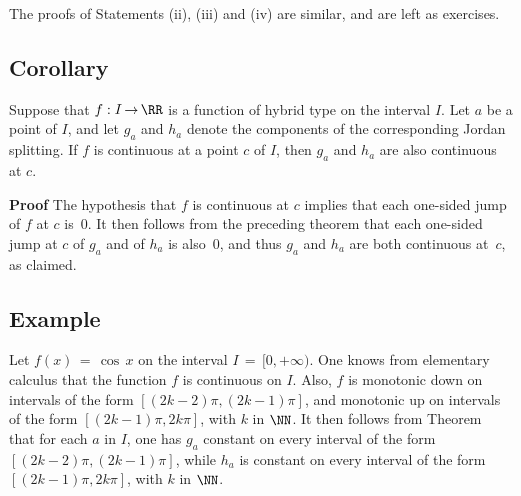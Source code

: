         The proofs of Statements (ii), (iii) and (iv) are similar, and are left as exercises.

\V
\V

             \subsection{\small{\bf Corollary}}
            \label{CorF40.160}

        Suppose that $f:I \,{\rightarrow}\, {\RR}$ is a function of hybrid type on the interval $I$.
    Let $a$ be a point of $I$, and let $g_{a}$ and $h_{a}$ denote the components of the corresponding Jordan splitting.
    If $f$ is continuous at a point $c$ of $I$, then $g_{a}$ and $h_{a}$ are also continuous at $c$.

\V

        {\bf Proof} The hypothesis that $f$ is continuous at $c$ implies that each one-sided jump of $f$ at $c$ is~$0$.
    It then follows from the preceding theorem that each one-sided jump at $c$ of $g_{a}$ and of $h_{a}$ is also~$0$, and thus $g_{a}$ and $h_{a}$ are both continuous at~$c$, as claimed.

\V
\V

             \subsection{\small{\bf Example}}
            \label{ExampF40.170}

\V

\hspace*{\parindent}Let $f(x) \,=\, {\cos}\,x$ on the interval $I \,=\,[0,+{\infty})$.
    One knows from elementary calculus that the function $f$ is continuous on $I$.
    Also, $f$ is monotonic down on intervals of the form $[(2k-2){\pi},(2k-1){\pi}]$,
    and monotonic up on intervals of the form $[(2k-1){\pi},2k{\pi}]$, with $k$ in ${\NN}$.
    It then follows from Theorem~ that for each $a$ in $I$, one has $g_{a}$ constant on every interval of the form $[(2k-2){\pi},(2k-1){\pi}]$,
    while $h_{a}$ is constant on every interval of the form $[(2k-1){\pi},2k{\pi}]$, with $k$ in ${\NN}$.

